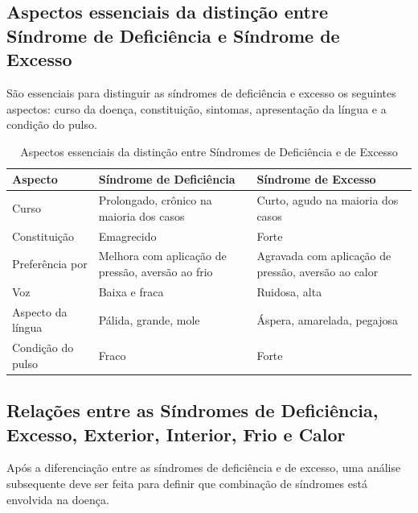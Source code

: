 \documentclass[12pt,oneside,a4paper]{book} %
\begin{document}
\subsection{ Aspectos essenciais da distinção entre Síndrome de Deficiência e Síndrome de Excesso}
São essenciais para distinguir as síndromes de deficiência e excesso os seguintes aspectos: curso da doença, constituição, sintomas, apresentação da língua e a condição do pulso. 


\begin{table}[ht]
	
	\centering
	{\renewcommand\arraystretch{1.25}
		\caption{Aspectos essenciais da distinção entre Síndromes de Deficiência e de Excesso}}
		\vspace{0.5cm}
		\begin{tabular}{l p{5.5cm} p{5.5cm}}
			
			\hline
			
			Aspecto &  
			Síndrome de Deficiência &
			Síndrome de Excesso				
			\\ \hline \hline
			  
			Curso &
			Prolongado, crônico na maioria dos casos &
			Curto, agudo na maioria dos casos
			\\  
			  
			Constituição &
			Emagrecido &
			Forte
			\\  
			  
			Preferência por &
			Melhora com aplicação de pressão, aversão ao frio &
			Agravada com aplicação de pressão, aversão ao calor
			\\  
			  
			Voz &
			Baixa e fraca &
			Ruidosa, alta
			\\  
			  
			Aspecto da língua &
			Pálida, grande, mole &
			Áspera, amarelada, pegajosa
			\\  
			  
			Condição do pulso &
			Fraco &
			Forte
			\\  
			\hline
			
	\end{tabular} 
	
	
\end{table} 


\subsection{Relações entre as Síndromes de Deficiência, Excesso, Exterior, Interior, Frio e Calor}
Após a diferenciação entre as síndromes de deficiência e de excesso, uma análise subsequente deve ser feita para definir que combinação de síndromes está envolvida na doença.
\end{document}
